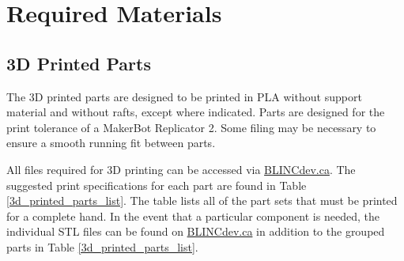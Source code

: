 
\chapter{Required Materials}  %

\label {Required Materials} %


\newcommand{\keyword}[1]{\textbf{#1}}
\newcommand{\tabhead}[1]{\textbf{#1}}
\newcommand{\code}[1]{\texttt{#1}}
\newcommand{\file}[1]{\texttt{\bfseries#1}}
\newcommand{\option}[1]{\texttt{\itshape#1}}


\section{3D Printed Parts}

The 3D printed parts are designed to be printed in PLA without support material and without rafts, except where indicated. Parts are designed for the print tolerance of a MakerBot Replicator 2. Some filing may be necessary to ensure a smooth running fit between parts.

All files required for 3D printing can be accessed via \href{https://blincdev.ca/}{BLINCdev.ca}. The suggested print specifications for each part are found in Table \ref{3d_printed_parts_list}. The table lists all of the part sets that must be printed for a complete hand. In the event that a particular component is needed, the individual STL files can be found on  \href{https://blincdev.ca/}{BLINCdev.ca} in addition to the grouped parts in Table \ref{3d_printed_parts_list}.

